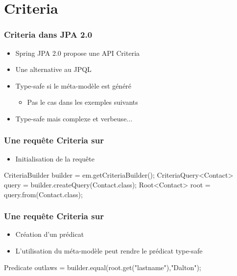 \section{Criteria}



\begin{frame}
 \frametitle{Criteria dans JPA 2.0}
 \begin{itemize}
  \item Spring JPA 2.0 propose une API Criteria
  \item Une alternative au JPQL
  \item Type-safe si le méta-modèle est généré
  \begin{itemize}
   \item Pas le cas dans les exemples suivants
  \end{itemize}
  \item Type-safe mais complexe et verbeuse...
 \end{itemize}
\end{frame}


\begin{frame}[fragile]
 \frametitle{Une requête Criteria sur }

 \begin{itemize}
  \item Initialisation de la requête
 \end{itemize}

 \begin{javacode}
CriteriaBuilder builder = em.getCriteriaBuilder();
CriteriaQuery<Contact> query = builder.createQuery(Contact.class);
Root<Contact> root = query.from(Contact.class);
 \end{javacode}
\end{frame}

\begin{frame}[fragile]
 \frametitle{Une requête Criteria sur }

 \begin{itemize}
  \item Création d'un prédicat
  \item L'utilisation du méta-modèle peut rendre le prédicat type-safe
 \end{itemize}

 \begin{javacode}
Predicate outlaws = builder.equal(root.get("lastname"),"Dalton");
 \end{javacode}
\end{frame}

